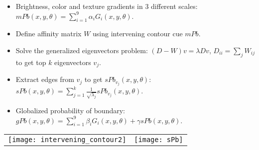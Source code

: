 \documentclass[11pt, a4paper, landscape]{article}
\begin{document}
\NewPage{}
\small
\vfill
\begin{itemize}
\item Brightness, color and texture gradients in 3 different scales: $mPb(x, y, \theta) = \sum\limits_{i = 1}^{9} \alpha_i G_i(x, y, \theta)$.
\item Define affinity matrix $W$ using intervening contour cue $mPb$.
\item Solve the generalized eigenvectors problem: $(D - W)v = \lambda D v$, $D_{ii} = \sum_j W_{ij}$\\ to get top $k$ eigenvectors $v_j$.
\item Extract edges from $v_j$ to get $sPb_{v_j}(x, y, \theta)$: $sPb(x, y, \theta) = \sum\limits_{j = 1}^{k} \frac{1}{\sqrt{\lambda_j}} sPb_{v_j} (x, y, \theta)$.
\item Globalized probability of boundary: $gPb(x, y, \theta) = \sum\limits_{i = 1}^{9} \beta_iG_i(x, y, \theta) + \gamma sPb(x, y, \theta)$.
\end{itemize}
\begin{table}
  \centering
  \begin{tabular}{@{} M{.3\linewidth} M{.7\linewidth} @{}}
      \texttt{[image: intervening\_contour2]}%
      &
      \texttt{[image: sPb]}%
  \end{tabular}
\end{table}
\vfill
\end{document}
